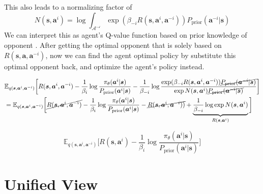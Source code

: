 This also leads to a normalizing factor of 
\begin{equation}
    N(\boldsymbol{s}, \boldsymbol{a}^{i}) = \log \int_{\mathcal{A^{-i}}} \exp(\beta_{-i} R(\boldsymbol{s}, \boldsymbol{a}^i, \boldsymbol{a}^{-i}))P_{\text{prior}}(\boldsymbol{a}^{-i} | \boldsymbol{s})
\end{equation}
We can interpret this as agent's Q-value function based on prior knowledge of opponent \cite{grau2018balancing}. After getting the optimal opponent that is solely based on $R(\boldsymbol{s}, \boldsymbol{a}, \boldsymbol{a}^{-i})$, now we can find the agent optimal policy by substitute this optimal opponent back, and optimize the agent's policy instead.

\begin{equation*}
    \begin{aligned}
        &\mathbb{E}_{q(\boldsymbol{s}, \boldsymbol{a}^i, \boldsymbol{a}^{-i})}\bigg[ R(\boldsymbol{s}, \boldsymbol{a}^i, \boldsymbol{a}^{-i})  - \frac{1}{\beta_{i}}\log \frac{\pi_{\theta}(\boldsymbol{a}^i | \boldsymbol{s})}{P_{\text{prior}}(\boldsymbol{a}^i | \boldsymbol{s})}  - \frac{1}{\beta_{-i}}\log \frac{\exp(\beta_{-i} R(\boldsymbol{s}, \boldsymbol{a}^i, \boldsymbol{a}^{-i}))\cancel{P_{\text{prior}}(\boldsymbol{a}^{-i} | \boldsymbol{s})}}{\exp N(\boldsymbol{s}, \boldsymbol{a}^{i}) \cancel{P_{\text{prior}}(\boldsymbol{a}^{-i} | \boldsymbol{s})} } \bigg] \\
        &= \mathbb{E}_{q(\boldsymbol{s}, \boldsymbol{a}^i, \boldsymbol{a}^{-i})}\bigg[ \cancel{R(\boldsymbol{s}, \boldsymbol{a}^i, \boldsymbol{a}^{-i})}  - \frac{1}{\beta_{i}}\log \frac{\pi_{\theta}(\boldsymbol{a}^i | \boldsymbol{s})}{P_{\text{prior}}(\boldsymbol{a}^i | \boldsymbol{s})}  - \cancel{R(\boldsymbol{s}, \boldsymbol{a}^i, \boldsymbol{a}^{-i}))} + \underbrace{\frac{1}{\beta_{-i}} \log \exp N(\boldsymbol{s}, \boldsymbol{a}^{i})}_{R(\boldsymbol{s}, \boldsymbol{a}^i)} \bigg]
    \end{aligned}
\end{equation*}

$$
\mathbb{E}_{q(\boldsymbol{s}, \boldsymbol{a}^i, \boldsymbol{a}^{-i})}\bigg[ R(\boldsymbol{s}, \boldsymbol{a}^i) - \frac{1}{\beta_{i}}\log \frac{\pi_{\theta}(\boldsymbol{a}^i | \boldsymbol{s})}{P_{\text{prior}}(\boldsymbol{a}^i | \boldsymbol{s})} \bigg]
$$

\section{Unified View}
